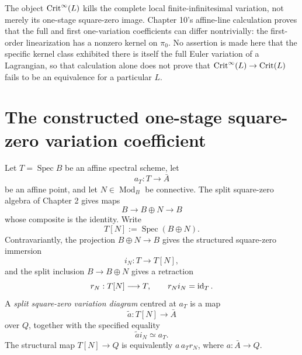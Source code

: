 \begin{remark}
\label{rem:var-full-critical-strong}
The object \(\operatorname{Crit}^{\infty}(L)\) kills the complete local finite-infinitesimal variation, not merely its one-stage square-zero image. Chapter 10's affine-line calculation proves that the full and first one-variation coefficients can differ nontrivially: the first-order linearization has a nonzero kernel on \(\pi_0\). No assertion is made here that the specific kernel class exhibited there is itself the full Euler variation of a Lagrangian, so that calculation alone does not prove that \(\operatorname{Crit}^{\infty}(L)\to\operatorname{Crit}(L)\) fails to be an equivalence for a particular \(L\).
\end{remark}

\section{The constructed one-stage square-zero variation coefficient}
\label{sec:var-square-zero-sector}

\begin{definition}
\label{def:var-split-sqz-test}
Let \(T=\operatorname{Spec}B\) be an affine spectral scheme, let
\[
    a_T:T\longrightarrow\bar A
\]
be an affine point, and let \(N\in\operatorname{Mod}_B\) be connective. The split square-zero algebra of Chapter 2 gives maps
\[
    B\longrightarrow B\oplus N\longrightarrow B
\]
whose composite is the identity. Write
\[
    T[N]:=\operatorname{Spec}(B\oplus N).
\]
Contravariantly, the projection \(B\oplus N\to B\) gives the structured square-zero immersion
\[
    i_N:T\longrightarrow T[N],
\]
and the split inclusion \(B\to B\oplus N\) gives a retraction
\[
    r_N:T[N]\longrightarrow T,
    \qquad
    r_Ni_N=\operatorname{id}_T.
\]
A \emph{split square-zero variation diagram} centred at \(a_T\) is a map
\[
    \widetilde a:T[N]\longrightarrow\bar A
\]
over \(Q\), together with the specified equality
\[
    \widetilde a i_N\simeq a_T.
\]
The structural map \(T[N]\to Q\) is equivalently \(a\,a_T r_N\), where \(a:\bar A\to Q\).
\end{definition}

